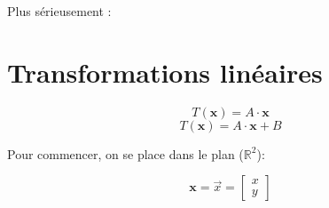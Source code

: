 \documentclass[compress]{beamer}
\begin{document}
\begin{frame}{}
    \begin{center}
Plus sérieusement :
    \end{center}
        \tableofcontents
\end{frame}

\section[Transformations]{Transformations linéaires}

\begin{frame}{}
    \begin{center}
\Large
\[
    T(\mathbf{x}) = A \cdot \mathbf{x}
\]
\[
    T(\mathbf{x}) = A \cdot \mathbf{x} + B
\]
\normalsize
{}
    \end{center}

\end{frame}

\begin{frame}{}

Pour commencer, on se place dans le plan ($\mathbb{R}^2$):

\[
\mathbf{x} = \vec{x} = \begin{bmatrix} x \\ y \end{bmatrix}
\]

\end{frame}
\end{document}
